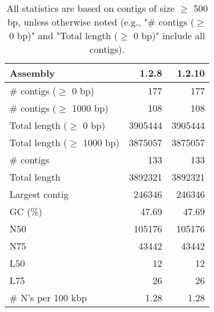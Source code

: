 \documentclass[12pt,a4paper]{article}
\begin{document}
\begin{table}[ht]
\begin{center}
\caption{All statistics are based on contigs of size $\geq$ 500 bp, unless otherwise noted (e.g., "\# contigs ($\geq$ 0 bp)" and "Total length ($\geq$ 0 bp)" include all contigs).}
\begin{tabular}{|l*{2}{|r}|}
\hline
Assembly & 1.2.8 & 1.2.10 \\ \hline
\# contigs ($\geq$ 0 bp) & 177 & 177 \\ \hline
\# contigs ($\geq$ 1000 bp) & 108 & 108 \\ \hline
Total length ($\geq$ 0 bp) & 3905444 & 3905444 \\ \hline
Total length ($\geq$ 1000 bp) & 3875057 & 3875057 \\ \hline
\# contigs & 133 & 133 \\ \hline
Total length & 3892321 & 3892321 \\ \hline
Largest contig & 246346 & 246346 \\ \hline
GC (\%) & 47.69 & 47.69 \\ \hline
N50 & 105176 & 105176 \\ \hline
N75 & 43442 & 43442 \\ \hline
L50 & 12 & 12 \\ \hline
L75 & 26 & 26 \\ \hline
\# N's per 100 kbp & 1.28 & 1.28 \\ \hline
\end{tabular}
\end{center}
\end{table}
\end{document}
